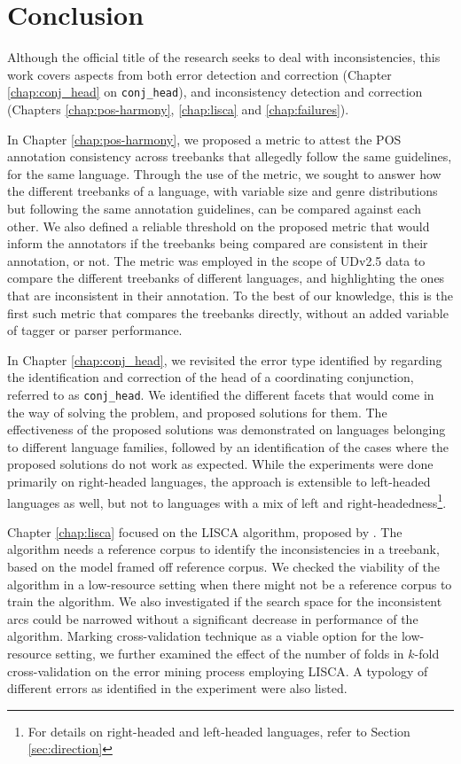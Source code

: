 \chapter*{Conclusion}

Although the official title of the research seeks to deal with inconsistencies, this work covers aspects from both error detection and correction (Chapter \ref{chap:conj_head} on \texttt{conj\_head}), and inconsistency detection and correction (Chapters \ref{chap:pos-harmony}, \ref{chap:lisca} and \ref{chap:failures}). 

In Chapter \ref{chap:pos-harmony}, we proposed a metric to attest the POS annotation consistency across treebanks that allegedly follow the same guidelines, for the same language. Through the use of the metric, we sought to answer how the different treebanks of a language, with variable size and genre distributions but following the same annotation guidelines, can be compared against each other. We also defined a reliable threshold on the proposed metric that would inform the annotators if the treebanks being compared are consistent in their annotation, or not. The metric was employed in the scope of UDv2.5 \citep{UDv2.5} data to compare the different treebanks of different languages, and highlighting the ones that are inconsistent in their annotation. To the best of our knowledge, this is the first such metric that compares the treebanks directly, without an added variable of tagger or parser performance.

In Chapter \ref{chap:conj_head}, we revisited the error type identified by \cite{alzetta2017dangerous} regarding the identification and correction of the head of a coordinating conjunction, referred to as \texttt{conj\_head}. We identified the different facets that would come in the way of solving the problem, and proposed solutions for them. The effectiveness of the proposed solutions was demonstrated on languages belonging to different language families, followed by an identification of the cases where the proposed solutions do not work as expected. While the experiments were done primarily on right-headed languages, the approach is extensible to left-headed languages as well, but not to languages with a mix of left and right-headedness\footnote{For details on right-headed and left-headed languages, refer to Section \ref{sec:direction}}.

Chapter \ref{chap:lisca} focused on the LISCA algorithm, proposed by \cite{lisca}. The algorithm needs a reference corpus to identify the inconsistencies in a treebank, based on the model framed off reference corpus. We checked the viability of the algorithm in a low-resource setting when there might not be a reference corpus to train the algorithm. We also investigated if the search space for the inconsistent arcs could be narrowed without a significant decrease in performance of the algorithm. Marking cross-validation technique as a viable option for the low-resource setting, we further examined the effect of the number of folds in $k$-fold cross-validation on the error mining process employing LISCA. A typology of different errors as identified in the experiment were also listed.


